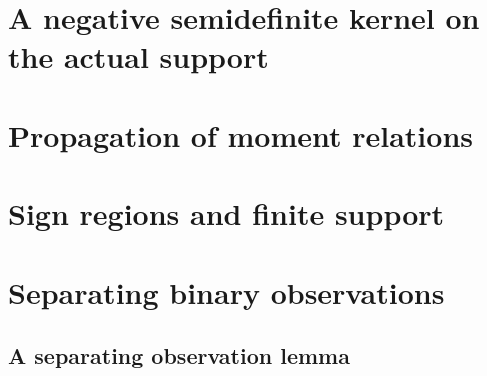 \section{A negative semidefinite kernel on the actual support}


\section{Propagation of moment relations}\label{sec-propagation}


\section{Sign regions and finite support}\label{sec-signregions}


\section{Separating binary observations}\label{sec-separation}


\subsection{A separating observation lemma}

